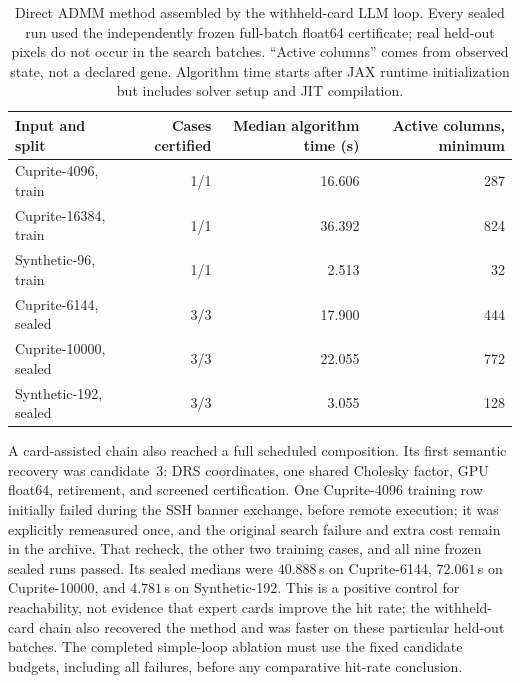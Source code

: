 \begin{table}[t]
\centering\small
\begin{tabular}{lrrr}
\toprule
Input and split & Cases certified & Median algorithm time (s) & Active columns, minimum \\
\midrule
Cuprite-4096, train & 1/1 & 16.606 & 287 \\
Cuprite-16384, train & 1/1 & 36.392 & 824 \\
Synthetic-96, train & 1/1 & 2.513 & 32 \\
Cuprite-6144, sealed & 3/3 & 17.900 & 444 \\
Cuprite-10000, sealed & 3/3 & 22.055 & 772 \\
Synthetic-192, sealed & 3/3 & 3.055 & 128 \\
\bottomrule
\end{tabular}
\caption{Direct ADMM method assembled by the withheld-card LLM loop.
Every sealed run used the independently frozen full-batch float64 certificate;
real held-out pixels do not occur in the search batches. ``Active columns''
comes from observed state, not a declared gene. Algorithm time starts after JAX
runtime initialization but includes solver setup and JIT compilation.}
\label{tab:llm-loop-recovery}
\end{table}

A card-assisted chain also reached a full scheduled composition. Its first
semantic recovery was candidate~3: DRS coordinates, one shared Cholesky factor,
GPU float64, retirement, and screened certification. One Cuprite-4096 training
row initially failed during the SSH banner exchange, before remote execution;
it was explicitly remeasured once, and the original search failure and extra
cost remain in the archive. That recheck, the other two training cases, and
all nine frozen sealed runs passed. Its sealed medians were $40.888$\,s on
Cuprite-6144, $72.061$\,s on Cuprite-10000, and $4.781$\,s on Synthetic-192.
This is a positive control for reachability, not evidence that expert cards
improve the hit rate; the withheld-card chain also recovered the method and was
faster on these particular held-out batches. The completed simple-loop ablation
must use the fixed candidate budgets, including all failures, before any
comparative hit-rate conclusion.

